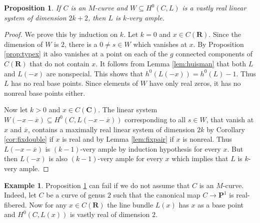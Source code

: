 \documentclass[12pt]{amsart}
\newcounter{thmcounter}
\numberwithin{equation}{section}
\numberwithin{thmcounter}{section}
\newtheorem{proposition}[thmcounter]{Proposition}
\theoremstyle{definition}
\newtheorem{example}[thmcounter]{Example}
\theoremstyle{claim}
\newcommand{\nR}{\mathbf{R}}
\newcommand{\nC}{\mathbf{C}}
\newcommand{\nP}{\mathbf{P}}
\begin{document}
\begin{proposition}\label{prop:vastlyrealveryample}
    If $C$ is an $M$-curve and $W\subseteq H^0(C,L)$ is a vastly real linear system of dimension $2k+2$, then $L$ is $k$-very ample.
\end{proposition}

\begin{proof}
     We prove this by induction on $k$. Let $k=0$ and $x\in C(\nR)$. Since the dimension of $W$ is $2$, there is a $0\neq s\in W$ which vanishes at $x$. By Proposition \ref{prop:typex} it also vanishes at a point on each of the $g$ connected components of $C(\nR)$ that do not contain $x$. It follows from Lemma \ref{lem:huisman} that both $L$ and $L(-x)$ are nonspecial. This shows that $h^0(L(-x))=h^0(L)-1$. Thus $L$ has no real base points. Since elements of $W$ have only real zeros, it has no nonreal base points either.

\medskip

\noindent     Now let $k>0$ and $x\in C(\nC)$. The linear system $W(-x-\overline{x})\subseteq H^0(C,L(-x-\overline{x}))$ corresponding to all $s\in W$, that vanish at $x$ and $\overline{x}$, contains a maximally real linear system of dimension $2k$ by Corollary \ref{cor:fixdouble} if $x$ is real and by Lemma \ref{lem:fixpair} if $x$ is nonreal. Thus $L(-x-\overline{x})$ is $(k-1)$-very ample by induction hypothesis for every $x$. But then $L(-x)$ is also $(k-1)$-very ample for every $x$ which implies that $L$ is $k$-very ample.
\end{proof}

\begin{example}
    Proposition \ref{prop:vastlyrealveryample} can fail if we do not assume that $C$ is an $M$-curve. Indeed, let $C$ be a curve of genus $2$ such that the canonical map $C\to\nP^1$ is real-fibered. Now for any $x\in C(\nR)$ the line bundle $L(x)$ has $x$ as a base point and $H^0(C,L(x))$ is vastly real of dimension $2$.
\end{example}
\end{document}
